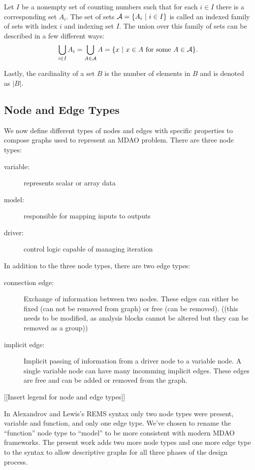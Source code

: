   Let $I$ be a nonempty set of counting numbers such that for each $i \in I$ there is a corresponding set $A_i$. 
  The set of sets $\mathcal A = \{A_i \ | \  i \in I\}$ is called an indexed family of sets with index $i$ and 
  indexing set $I$\cite{smith2006}. 
  The union over this family of sets can be described in a few different ways:
  \begin{equation}
  \bigcup_{i \in I} A_i = \bigcup_{A \in \mathcal A} A = \{x \ | \  x \in A \textrm{ for some } A \in \mathcal A\}.
  \end{equation}

  Lastly, the cardinality of a set $B$ is the number of elements in $B$ and is denoted as $|B|$.

\subsection{Node and Edge Types}
  \label{ss:types}
  We now define different types of nodes and edges with specific properties to compose graphs used to represent an MDAO problem. 
  There are three node types:  
  \begin{description}
  \item[variable: ] represents scalar or array data
  \item[model:] responsible for mapping inputs to outputs
  \item[driver:] control logic capable of managing iteration
  \end{description}

  In addition to the three node types, there are two edge types: 

  \begin{description}
  \item[connection edge:] Exchange of information between two nodes. These edges 
  can either be fixed (can not be removed from graph) or free (can be removed). ((this needs to be modified, as analysis blocks cannot be altered but they can be removed as a group))
  \item [implicit edge:] Implicit passing of information from a driver node to a 
    variable node. A single variable node can have many incomming implicit edges. These edges are 
    free and can be added or removed from the graph. 
  \end{description}

  [[Insert legend for node and edge types]]

  In Alexandrov and Lewis's REMS syntax only two node types were present, variable 
  and function, and only one edge type\cite{alexandrov2004}. We've chosen to rename the ``function'' node 
  type to ``model'' to be more consistent with modern MDAO frameworks. The present work 
  adds two more node types and one more edge type to the syntax to allow descriptive
  graphs for all three phases of the design process. 

